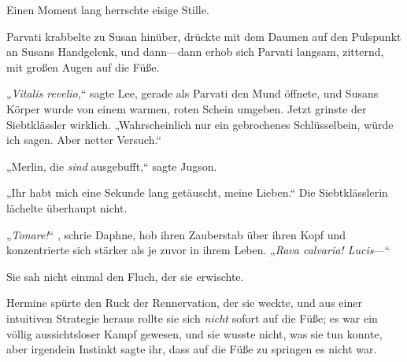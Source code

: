Einen Moment lang herrschte eisige Stille.

Parvati krabbelte zu Susan hinüber, drückte mit dem Daumen auf den Pulspunkt an Susans Handgelenk, und dann—dann erhob sich Parvati langsam, zitternd, mit großen Augen auf die Füße.

„\emph{Vitalis revelio},“ sagte Lee, gerade als Parvati den Mund öffnete, und Susans Körper wurde von einem warmen, roten Schein umgeben. Jetzt grinste der Siebtklässler wirklich. „Wahrscheinlich nur ein gebrochenes Schlüsselbein, würde ich sagen. Aber netter Versuch.“

„Merlin, die \emph{sind} ausgebufft,“ sagte Jugson.

„Ihr habt mich eine Sekunde lang getäuscht, meine Lieben.“ Die Siebtklässlerin lächelte überhaupt nicht.

„\emph{Tonare!}“ , schrie Daphne, hob ihren Zauberstab über ihren Kopf und konzentrierte sich stärker als je zuvor in ihrem Leben. „\emph{Rava calvaria! Lucis}—“

Sie sah nicht einmal den Fluch, der sie erwischte.

\later

Hermine spürte den Ruck der Rennervation, der sie weckte, und aus einer intuitiven Strategie heraus rollte sie sich \emph{nicht} sofort auf die Füße; es war ein völlig aussichtsloser Kampf gewesen, und sie wusste nicht, was sie tun konnte, aber irgendein Instinkt sagte ihr, dass auf die Füße zu springen es nicht war.

